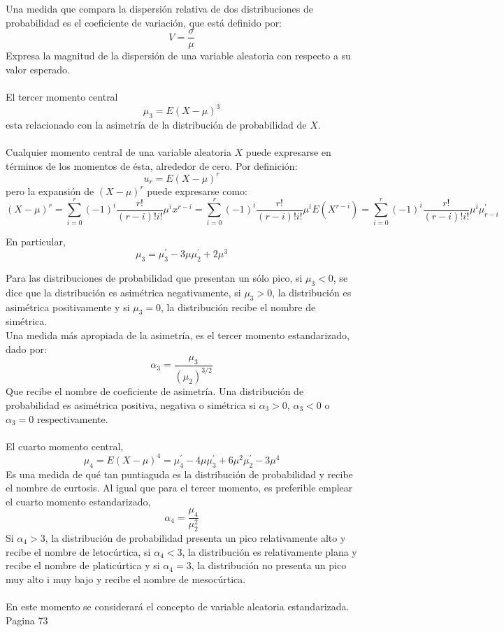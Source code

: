  Una medida que compara la dispersión relativa de dos distribuciones de probabilidad es el coeficiente de variación, que está definido por:
 $$V=\dfrac{\sigma}{\mu}$$
 Expresa la magnitud de la dispersión de una variable aleatoria con respecto a su valor esperado.\\\\

 El tercer momento central
 $$\mu_3 = E(X-\mu)^3$$
 esta relacionado con la asimetría de la distribución de probabilidad de $X$.\\\\

 Cualquier momento central de una variable aleatoria $X$ puede expresarse en términos de los momentos de ésta, alrededor de cero. Por definición:
 $$u_r = E(X-\mu)^r$$
 pero la expansión de $(X-\mu)^r$ puede expresarse como:
 $$(X-\mu)^r = \sum_{i=0}^r (-1)^i \dfrac{r!}{(r-i)!i!}\mu^i x^{r-i} = \sum_{i=0}^r (-1)^i \dfrac{r!}{(r-i)!i!}\mu^i E(X^{r-i}) = \sum_{i=0}^r (-1)^i \dfrac{r!}{(r-i)!i!}\mu^i \mu^{'}_{r-i}$$

 En particular,
 $$\mu_3 = \mu_3^{'} - 3\mu\mu^{'}_2 + 2\mu^3$$

 Para las distribuciones de probabilidad que presentan un sólo pico, si $\mu_3 < 0$, se dice que la distribución es asimétrica negativamente, si $\mu_3 > 0$, la distribución es asimétrica positivamente y si $\mu_3 = 0$, la distribución recibe el nombre de simétrica.\\
 Una medida más apropiada de la asimetría, es el tercer momento estandarizado, dado por:
 $$\alpha_3 = \dfrac{\mu_3}{(\mu_2)^{3/2}}$$
 Que recibe el nombre de coeficiente de asimetría. Una distribución de probabilidad es asimétrica positiva, negativa o simétrica si $\alpha_3 > 0$, $\alpha_3<0$ o $\alpha_3=0$ respectivamente.\\\\

 El cuarto momento central, 
 $$\mu_4 = E(X-\mu)^4 = \mu^{'}_4 - 4\mu \mu^{'}_3 + 6\mu^2 \mu^{'}_2 - 3 \mu^4$$
 Es una medida de qué tan puntiaguda es la distribución de probabilidad y recibe el nombre de curtosis. Al igual que para el tercer momento, es preferible emplear el cuarto momento estandarizado,
 $$\alpha_4  = \dfrac{\mu_4}{\mu^2_2}$$
 Si $\alpha_4>3$, la distribución de probabilidad presenta un pico relativamente alto y recibe el nombre de letocúrtica, si $\alpha_4<3$, la distribución es relativamente plana y recibe el nombre de platicúrtica y si $\alpha_4 = 3$, la distribución no presenta un pico muy alto i muy bajo y recibe el nombre de mesocúrtica. \\\\

En este momento se considerará el concepto de variable aleatoria estandarizada. 
Pagina 73


